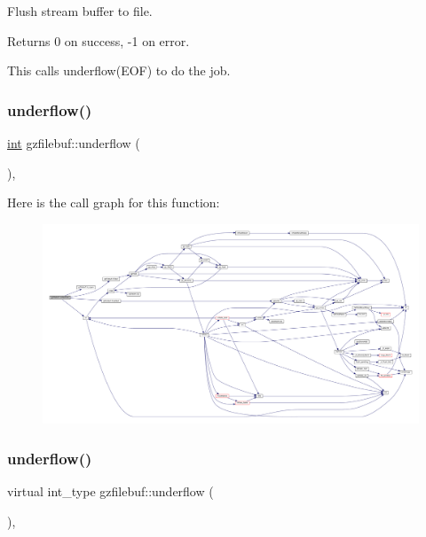 Flush stream buffer to file. 

\begin{DoxyReturn}{Returns}
0 on success, -\/1 on error.
\end{DoxyReturn}
This calls underflow(\+E\+O\+F) to do the job. \mbox{\label{classgzfilebuf_a40522eababebedcaab829cf0b25d4c04}} 
\subsubsection{\texorpdfstring{underflow()}{underflow()}\hspace{0.1cm}{\footnotesize\ttfamily [1/2]}}
{\footnotesize\ttfamily \mbox{\hyperlink{ioapi_8h_a787fa3cf048117ba7123753c1e74fcd6}{int}} gzfilebuf\+::underflow (\begin{DoxyParamCaption}{ }\end{DoxyParamCaption})\hspace{0.3cm}{\ttfamily [protected]}, {\ttfamily [virtual]}}

Here is the call graph for this function\+:
\nopagebreak
\begin{figure}[H]
\begin{center}
\leavevmode
\includegraphics[width=350pt]{classgzfilebuf_a40522eababebedcaab829cf0b25d4c04_cgraph}
\end{center}
\end{figure}
\mbox{\label{classgzfilebuf_a23768f9935022e54608c53173f0047c0}} 
\subsubsection{\texorpdfstring{underflow()}{underflow()}\hspace{0.1cm}{\footnotesize\ttfamily [2/2]}}
{\footnotesize\ttfamily virtual int\+\_\+type gzfilebuf\+::underflow (\begin{DoxyParamCaption}{ }\end{DoxyParamCaption})\hspace{0.3cm}{\ttfamily [protected]}, {\ttfamily [virtual]}}



